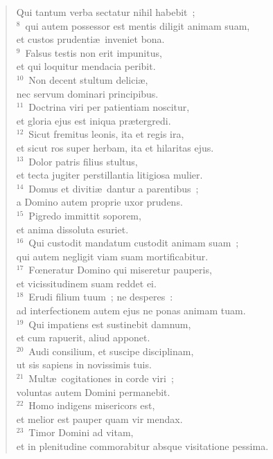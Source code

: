  \begin{flushleft}\begin{verse}Qui tantum verba sectatur nihil habebit~;\\
${}^{8}$~qui autem possessor est mentis diligit animam suam,\\ et custos prudenti\ae\ inveniet bona.\\
${}^{9}$~Falsus testis non erit impunitus,\\ et qui loquitur mendacia peribit.\\
${}^{10}$~Non decent stultum delici\ae ,\\ nec servum dominari principibus.\\
${}^{11}$~Doctrina viri per patientiam noscitur,\\ et gloria ejus est iniqua pr\ae tergredi.\\
${}^{12}$~Sicut fremitus leonis, ita et regis ira,\\ et sicut ros super herbam, ita et hilaritas ejus.\\
${}^{13}$~Dolor patris filius stultus,\\ et tecta jugiter perstillantia litigiosa mulier.\\
${}^{14}$~Domus et diviti\ae\ dantur a parentibus~;\\ a Domino autem proprie uxor prudens.\\
${}^{15}$~Pigredo immittit soporem,\\ et anima dissoluta esuriet.\\
${}^{16}$~Qui custodit mandatum custodit animam suam~;\\ qui autem negligit viam suam mortificabitur.\\
${}^{17}$~Fœneratur Domino qui miseretur pauperis,\\ et vicissitudinem suam reddet ei.\\
${}^{18}$~Erudi filium tuum~; ne desperes~:\\ ad interfectionem autem ejus ne ponas animam tuam.\\
${}^{19}$~Qui impatiens est sustinebit damnum,\\ et cum rapuerit, aliud apponet.\\
${}^{20}$~Audi consilium, et suscipe disciplinam,\\ ut sis sapiens in novissimis tuis.\\
${}^{21}$~Mult\ae\ cogitationes in corde viri~;\\ voluntas autem Domini permanebit.\\
${}^{22}$~Homo indigens misericors est,\\ et melior est pauper quam vir mendax.\\
${}^{23}$~Timor Domini ad vitam,\\ et in plenitudine commorabitur absque visitatione pessima.\end{verse}\end{flushleft}


